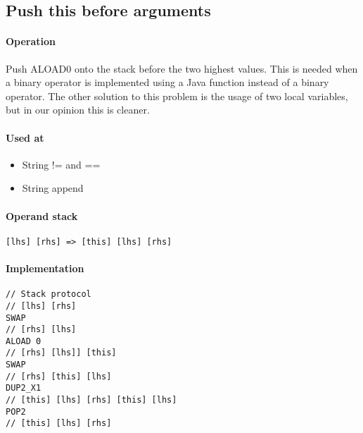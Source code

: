 \subsection{Push this before arguments}
\paragraph{Operation}
Push ALOAD0 onto the stack before the two highest values. This is needed when a binary operator is implemented using a Java function instead of a binary operator. The other solution to this problem is the usage of two local variables, but in our opinion this is cleaner.

\paragraph{Used at}
\begin{itemize}
	\item{String != and ==}
	\item{String append}
\end{itemize}

\paragraph{Operand stack}
\verb+[lhs] [rhs] => [this] [lhs] [rhs]+

\paragraph{Implementation}
\begin{verbatim}
// Stack protocol
// [lhs] [rhs]
SWAP
// [rhs] [lhs]
ALOAD 0
// [rhs] [lhs]] [this]
SWAP
// [rhs] [this] [lhs]
DUP2_X1
// [this] [lhs] [rhs] [this] [lhs]
POP2
// [this] [lhs] [rhs]
\end{verbatim}

\subsection{}
